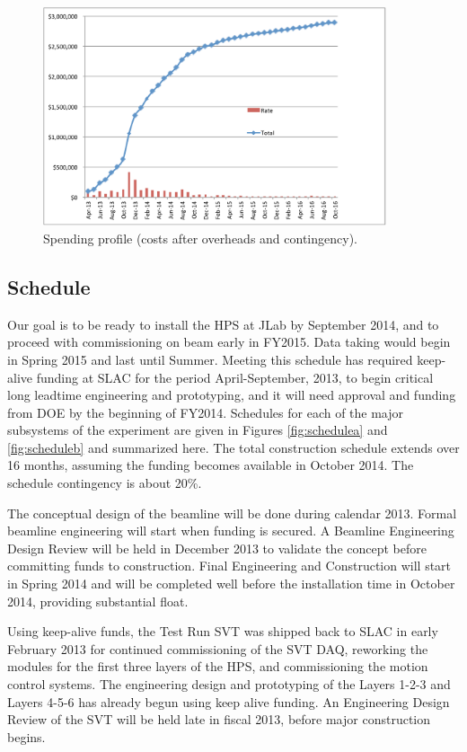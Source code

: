 \begin{figure}[ht]
\centering
\includegraphics[width=0.9\textwidth]{cost_schedule/spending} 
\caption{Spending profile (costs after overheads and contingency).}
\label{fig:spending_profile}
\end{figure}

\subsection{Schedule}
Our goal is to be ready to install the HPS at JLab by September 2014, and to proceed with commissioning on beam early in FY2015. Data taking 
would begin in Spring 2015 and last until Summer. Meeting this schedule has required keep-alive funding at SLAC for the period April-September, 2013, 
to begin critical long leadtime engineering and prototyping, and it will need  approval and funding from DOE by the beginning of FY2014. Schedules 
for each of the major subsystems of the experiment are given in Figures \ref{fig:schedulea} and \ref{fig:scheduleb} and summarized here. The total construction schedule extends over 16 months, 
assuming the funding becomes available in October 2014. The schedule contingency is about 20\%.
 
The conceptual design of the beamline will be done during calendar 2013. Formal beamline engineering will start when funding is secured. A Beamline Engineering 
Design Review will be held in December 2013 to validate the concept before committing funds to construction. 
Final Engineering and Construction will start in Spring 2014 and will be completed well before the installation time in October 2014, providing substantial float. 

Using keep-alive funds, the Test Run SVT was shipped back to SLAC in early February 2013 for continued commissioning of the SVT DAQ, reworking the 
modules for the first three layers of the HPS, and commissioning the motion control systems. The engineering design and prototyping of the Layers 1-2-3 and 
Layers 4-5-6 has already begun using keep alive funding. An Engineering Design Review of the SVT will be held late in fiscal 2013, before major construction
begins. 

